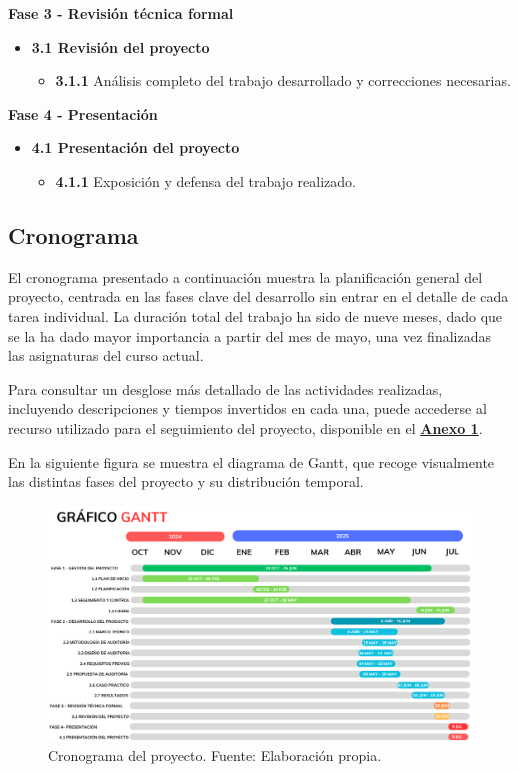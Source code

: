 \documentclass[a4paper, 11pt]{article}
\begin{document}
\textbf{\large Fase 3 - Revisión técnica formal} 

\begin{itemize}
    \item \textbf{3.1 Revisión del proyecto}
    \begin{itemize}
        \item \textbf{3.1.1} Análisis completo del trabajo desarrollado y correcciones necesarias.
    \end{itemize}
\end{itemize}


\textbf{\large Fase 4 - Presentación} 

\begin{itemize}
    \item \textbf{4.1 Presentación del proyecto}
    \begin{itemize}
        \item \textbf{4.1.1} Exposición y defensa del trabajo realizado.
    \end{itemize}
\end{itemize}


\subsection{Cronograma}

El cronograma presentado a continuación  muestra la planificación general del proyecto, centrada en las fases clave del desarrollo sin entrar 
en el detalle de cada tarea individual. La duración total del trabajo ha sido de nueve meses, dado que se la ha dado mayor importancia a 
partir del mes de mayo, una vez finalizadas las asignaturas del curso actual.

Para consultar un desglose más detallado de las actividades realizadas, incluyendo descripciones y tiempos invertidos en cada una, puede accederse al recurso utilizado para el seguimiento del proyecto, disponible en el \hyperref[anexo:1]{\textbf{Anexo 1}}.

En la siguiente figura se muestra el diagrama de Gantt, que recoge visualmente las distintas fases del proyecto y su distribución temporal.

\clearpage
\begin{landscape}
\begin{figure}[H]
    \centering
    \includegraphics[width=24cm]{images/gant.png}
    \caption{Cronograma del proyecto. Fuente: Elaboración propia.}
    \label{fig:cronograma}
\end{figure}
\end{landscape}
\clearpage
\end{document}
